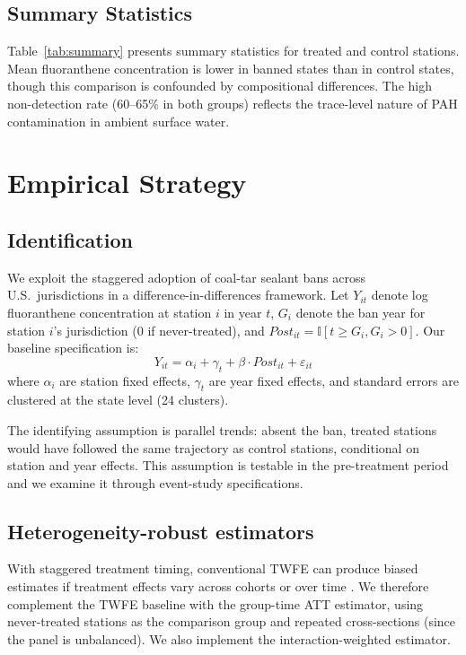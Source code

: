 \documentclass[12pt]{article}
\newcommand{\ind}{\mathbb{I}}
\begin{document}
\subsection{Summary Statistics}



Table~\ref{tab:summary} presents summary statistics for treated and control stations. Mean fluoranthene concentration is lower in banned states than in control states, though this comparison is confounded by compositional differences. The high non-detection rate (60--65\% in both groups) reflects the trace-level nature of PAH contamination in ambient surface water.

\section{Empirical Strategy}

\subsection{Identification}

We exploit the staggered adoption of coal-tar sealant bans across U.S.\ jurisdictions in a difference-in-differences framework. Let $Y_{it}$ denote log fluoranthene concentration at station $i$ in year $t$, $G_i$ denote the ban year for station $i$'s jurisdiction (0 if never-treated), and $Post_{it} = \ind[t \geq G_i, G_i > 0]$. Our baseline specification is:
\begin{equation}
Y_{it} = \alpha_i + \gamma_t + \beta \cdot Post_{it} + \varepsilon_{it}
\label{eq:twfe}
\end{equation}
where $\alpha_i$ are station fixed effects, $\gamma_t$ are year fixed effects, and standard errors are clustered at the state level (24 clusters).

The identifying assumption is parallel trends: absent the ban, treated stations would have followed the same trajectory as control stations, conditional on station and year effects. This assumption is testable in the pre-treatment period and we examine it through event-study specifications.

\subsection{Heterogeneity-robust estimators}

With staggered treatment timing, conventional TWFE can produce biased estimates if treatment effects vary across cohorts or over time \citep{goodman2021difference, dechaisemartin2020two}. We therefore complement the TWFE baseline with the \citet{callaway2021difference} group-time ATT estimator, using never-treated stations as the comparison group and repeated cross-sections (since the panel is unbalanced). We also implement the \citet{sun2021estimating} interaction-weighted estimator.
\end{document}
